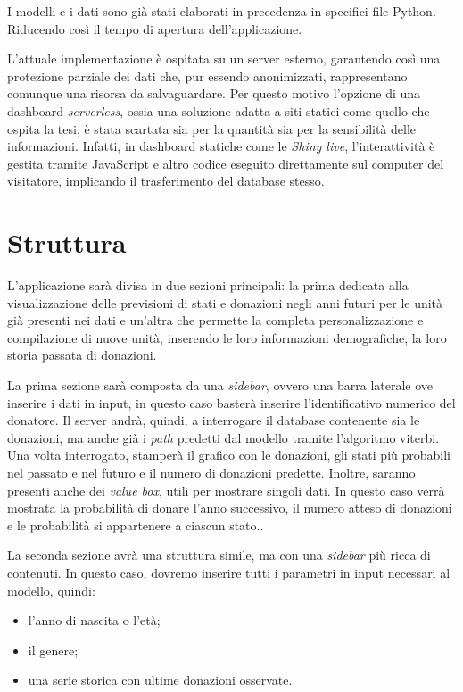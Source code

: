 \documentclass[
  italian,
  a4paper,
  a4paper,
  twoside,
  open=right,
  12pt]{scrbook}
\theoremstyle{definition}
\theoremstyle{remark}
\begin{document}
I modelli e i dati sono già stati elaborati in precedenza in specifici
file Python. Riducendo così il tempo di apertura dell'applicazione.

L'attuale implementazione è ospitata su un server esterno, garantendo
così una protezione parziale dei dati che, pur essendo anonimizzati,
rappresentano comunque una risorsa da salvaguardare. Per questo motivo
l'opzione di una dashboard \emph{serverless}, ossia una soluzione adatta
a siti statici come quello che ospita la tesi, è stata scartata sia per
la quantità sia per la sensibilità delle informazioni. Infatti, in
dashboard statiche come le \emph{Shiny live}, l'interattività è gestita
tramite JavaScript e altro codice eseguito direttamente sul computer del
visitatore, implicando il trasferimento del database stesso.

\section{Struttura}\label{struttura}

L'applicazione sarà divisa in due sezioni principali: la prima dedicata
alla visualizzazione delle previsioni di stati e donazioni negli anni
futuri per le unità già presenti nei dati e un'altra che permette la
completa personalizzazione e compilazione di nuove unità, inserendo le
loro informazioni demografiche, la loro storia passata di donazioni.

La prima sezione sarà composta da una \emph{sidebar}, ovvero una barra
laterale ove inserire i dati in input, in questo caso basterà inserire
l'identificativo numerico del donatore. Il server andrà, quindi, a
interrogare il database contenente sia le donazioni, ma anche già i
\emph{path} predetti dal modello tramite l'algoritmo viterbi. Una volta
interrogato, stamperà il grafico con le donazioni, gli stati più
probabili nel passato e nel futuro e il numero di donazioni predette.
Inoltre, saranno presenti anche dei \emph{value box}, utili per mostrare
singoli dati. In questo caso verrà mostrata la probabilità di donare
l'anno successivo, il numero atteso di donazioni e le probabilità si
appartenere a ciascun stato..

La seconda sezione avrà una struttura simile, ma con una \emph{sidebar}
più ricca di contenuti. In questo caso, dovremo inserire tutti i
parametri in input necessari al modello, quindi:

\begin{itemize}
\item
  l'anno di nascita o l'età;
\item
  il genere;
\item
  una serie storica con ultime donazioni osservate.
\end{itemize}
\end{document}
